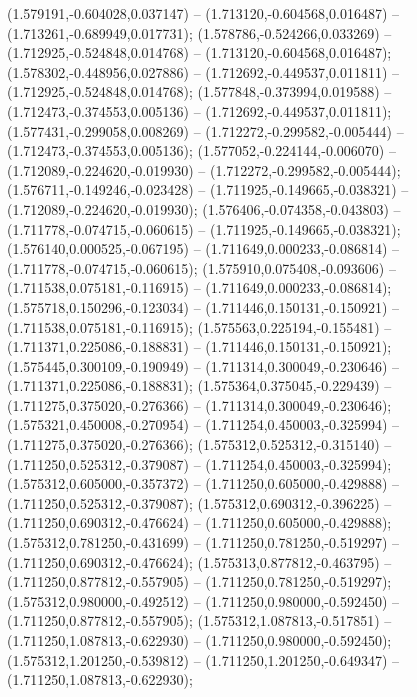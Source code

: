  (1.579191,-0.604028,0.037147) -- (1.713120,-0.604568,0.016487) -- (1.713261,-0.689949,0.017731);
 (1.578786,-0.524266,0.033269) -- (1.712925,-0.524848,0.014768) -- (1.713120,-0.604568,0.016487);
 (1.578302,-0.448956,0.027886) -- (1.712692,-0.449537,0.011811) -- (1.712925,-0.524848,0.014768);
 (1.577848,-0.373994,0.019588) -- (1.712473,-0.374553,0.005136) -- (1.712692,-0.449537,0.011811);
 (1.577431,-0.299058,0.008269) -- (1.712272,-0.299582,-0.005444) -- (1.712473,-0.374553,0.005136);
 (1.577052,-0.224144,-0.006070) -- (1.712089,-0.224620,-0.019930) -- (1.712272,-0.299582,-0.005444);
 (1.576711,-0.149246,-0.023428) -- (1.711925,-0.149665,-0.038321) -- (1.712089,-0.224620,-0.019930);
 (1.576406,-0.074358,-0.043803) -- (1.711778,-0.074715,-0.060615) -- (1.711925,-0.149665,-0.038321);
 (1.576140,0.000525,-0.067195) -- (1.711649,0.000233,-0.086814) -- (1.711778,-0.074715,-0.060615);
 (1.575910,0.075408,-0.093606) -- (1.711538,0.075181,-0.116915) -- (1.711649,0.000233,-0.086814);
 (1.575718,0.150296,-0.123034) -- (1.711446,0.150131,-0.150921) -- (1.711538,0.075181,-0.116915);
 (1.575563,0.225194,-0.155481) -- (1.711371,0.225086,-0.188831) -- (1.711446,0.150131,-0.150921);
 (1.575445,0.300109,-0.190949) -- (1.711314,0.300049,-0.230646) -- (1.711371,0.225086,-0.188831);
 (1.575364,0.375045,-0.229439) -- (1.711275,0.375020,-0.276366) -- (1.711314,0.300049,-0.230646);
 (1.575321,0.450008,-0.270954) -- (1.711254,0.450003,-0.325994) -- (1.711275,0.375020,-0.276366);
 (1.575312,0.525312,-0.315140) -- (1.711250,0.525312,-0.379087) -- (1.711254,0.450003,-0.325994);
 (1.575312,0.605000,-0.357372) -- (1.711250,0.605000,-0.429888) -- (1.711250,0.525312,-0.379087);
 (1.575312,0.690312,-0.396225) -- (1.711250,0.690312,-0.476624) -- (1.711250,0.605000,-0.429888);
 (1.575312,0.781250,-0.431699) -- (1.711250,0.781250,-0.519297) -- (1.711250,0.690312,-0.476624);
 (1.575313,0.877812,-0.463795) -- (1.711250,0.877812,-0.557905) -- (1.711250,0.781250,-0.519297);
 (1.575312,0.980000,-0.492512) -- (1.711250,0.980000,-0.592450) -- (1.711250,0.877812,-0.557905);
 (1.575312,1.087813,-0.517851) -- (1.711250,1.087813,-0.622930) -- (1.711250,0.980000,-0.592450);
 (1.575312,1.201250,-0.539812) -- (1.711250,1.201250,-0.649347) -- (1.711250,1.087813,-0.622930);
